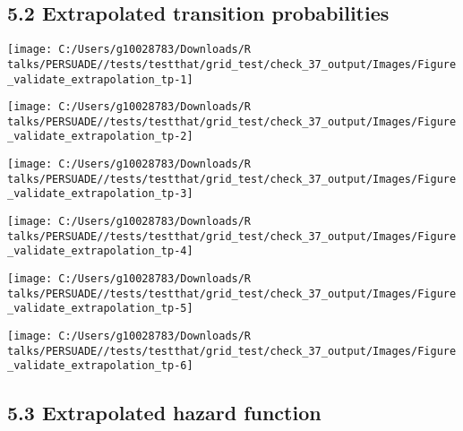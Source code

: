 \documentclass[
]{article}
\begin{document}
\clearpage

\subsection{5.2 Extrapolated transition
probabilities}\label{extrapolated-transition-probabilities}

\begin{flushleft}\texttt{[image: C:/Users/g10028783/Downloads/R talks/PERSUADE//tests/testthat/grid\_test/check\_37\_output/Images/Figure\_validate\_extrapolation\_tp-1]} \end{flushleft}

\begin{flushleft}\texttt{[image: C:/Users/g10028783/Downloads/R talks/PERSUADE//tests/testthat/grid\_test/check\_37\_output/Images/Figure\_validate\_extrapolation\_tp-2]} \end{flushleft}

\begin{flushleft}\texttt{[image: C:/Users/g10028783/Downloads/R talks/PERSUADE//tests/testthat/grid\_test/check\_37\_output/Images/Figure\_validate\_extrapolation\_tp-3]} \end{flushleft}

\begin{flushleft}\texttt{[image: C:/Users/g10028783/Downloads/R talks/PERSUADE//tests/testthat/grid\_test/check\_37\_output/Images/Figure\_validate\_extrapolation\_tp-4]} \end{flushleft}

\begin{flushleft}\texttt{[image: C:/Users/g10028783/Downloads/R talks/PERSUADE//tests/testthat/grid\_test/check\_37\_output/Images/Figure\_validate\_extrapolation\_tp-5]} \end{flushleft}

\begin{flushleft}\texttt{[image: C:/Users/g10028783/Downloads/R talks/PERSUADE//tests/testthat/grid\_test/check\_37\_output/Images/Figure\_validate\_extrapolation\_tp-6]} \end{flushleft}

\clearpage

\subsection{5.3 Extrapolated hazard
function}\label{extrapolated-hazard-function}
\end{document}

